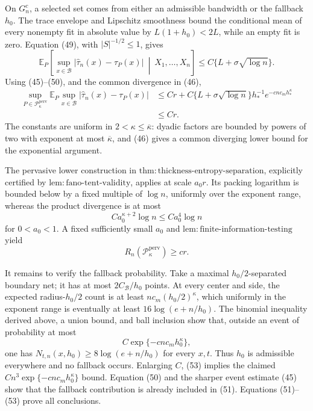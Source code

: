On \(G_n^c\), a selected set comes from either an admissible bandwidth or the fallback \(h_0\). The trace envelope and Lipschitz smoothness bound the conditional mean of every nonempty fit in absolute value by \(L(1+h_0)<2L\), while an empty fit is zero. Equation (49), with \(|S|^{-1/2}\le1\), gives
\[
 \mathbb E_P\left[\sup_{x\in\mathcal B}|\widehat\tau_n(x)-\tau_P(x)|\ \middle|\ X_1,\ldots,X_n\right]
 \le C\{L+\sigma\sqrt{\log n}\}. \tag{50}
\]
Using (45)--(50), and the common divergence in (46),
\[
 \begin{aligned}
 \sup_{P\in\mathcal P_{\kappa}^{\mathrm{perv}}}
 \mathbb E_P\sup_{x\in\mathcal B}|\widehat\tau_n(x)-\tau_P(x)|
 &\le Cr+C\{L+\sigma\sqrt{\log n}\}h_*^{-1}e^{-cnc_mh_*^{\kappa}}\\
 &\le Cr. 
 \end{aligned} \tag{51}
\]
The constants are uniform in \(2<\kappa\le\overline\kappa\): dyadic factors are bounded by powers of two with exponent at most \(\overline\kappa\), and (46) gives a common diverging lower bound for the exponential argument.

The pervasive lower construction in \(\mathrm{thm:thickness\text{-}entropy\text{-}separation}\), explicitly certified by \(\mathrm{lem:fano\text{-}tent\text{-}validity}\), applies at scale \(a_0r\). Its packing logarithm is bounded below by a fixed multiple of \(\log n\), uniformly over the exponent range, whereas the product divergence is at most
\[
 Ca_0^{\kappa+2}\log n\le Ca_0^4\log n
\]
for \(0<a_0<1\). A fixed sufficiently small \(a_0\) and \(\mathrm{lem:finite\text{-}information\text{-}testing}\) yield
\[
 R_n(\mathcal P_{\kappa}^{\mathrm{perv}})\ge cr. \tag{52}
\]

It remains to verify the fallback probability. Take a maximal \(h_0/2\)-separated boundary net; it has at most \(2C_{\mathcal B}/h_0\) points. At every center and side, the expected radius-\(h_0/2\) count is at least \(nc_m(h_0/2)^{\kappa}\), which uniformly in the exponent range is eventually at least \(16\log(e+n/h_0)\). The binomial inequality derived above, a union bound, and ball inclusion show that, outside an event of probability at most
\[
 C\exp\{-cnc_mh_0^{\kappa}\}, \tag{53}
\]
one has \(N_{t,n}(x,h_0)\ge8\log(e+n/h_0)\) for every \(x,t\). Thus \(h_0\) is admissible everywhere and no fallback occurs. Enlarging \(C\), (53) implies the claimed \(Cn^3\exp\{-cnc_mh_0^{\kappa}\}\) bound. Equation (50) and the sharper event estimate (45) show that the fallback contribution is already included in (51). Equations (51)--(53) prove all conclusions.